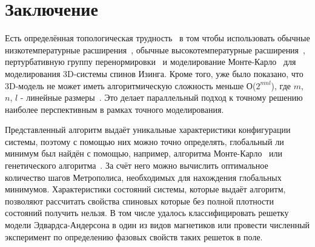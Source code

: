 \documentclass[10pt]{article}
\begin{document}
	\section*{Заключение}
	Есть определённая топологическая трудность~\cite{zhang2018topological} в том чтобы использовать обычные низкотемпературные расширения~\cite{katz2007mathematics}, обычные высокотемпературные расширения~\cite{zhang2013mathematical}, пертурбативную группу перенормировки~\cite{zhang2016mathematical} и моделирование Монте-Карло~\cite{zhang2017nature} для моделирования 3D-системы спинов Изинга. Кроме того, уже было показано, что 3D-модель не может иметь алгоритмическую сложность меньше О($2^{mnl}$), где $m$, $n$, $l$ - линейные размеры~\cite{zhang2020computational}. Это делает параллельный подход к точному решению наиболее перспективным в рамках точного моделирования.
	
	Представленный алгоритм выдаёт уникальные характеристики конфигурации системы, поэтому с помощью них можно точно определять, глобальный ли минимум был найдён с помощью, например, алгоритма Монте-Карло~\cite{janke2008monte} или генетического алгоритма~\cite{Panchenko2007}. За счёт него можно вычислить оптимальное количество шагов Метрополиса, необходимых для нахождения глобальных минимумов. Характеристики состояний системы, которые выдаёт алгоритм, позволяют рассчитать свойства спиновых которые без полной плотности состояний получить нельзя. В том числе удалось классифицировать решетку модели Эдвардса-Андерсона в один из видов магнетиков или провести численный эксперимент по определению фазовых свойств таких решеток в поле.
	
\end{document}
